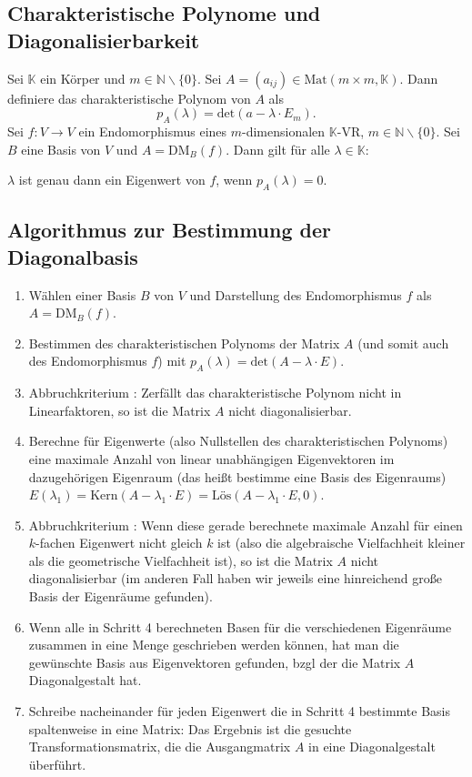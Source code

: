 \documentclass[a4paper,12pt]{article}
\newcommand{\RN}[1]{\uppercase\expandafter{\romannumeral#1}}
\begin{document}
\subsection{Charakteristische Polynome und Diagonalisierbarkeit}
Sei $\mathbb{K}$ ein Körper und $m \in \mathbb{N}\backslash\{0\}$. Sei $A=\left(a_{ij}\right) \in \text{Mat}\left(m\times m,\mathbb{K}\right)$. Dann definiere das charakteristische Polynom von $A$ als
\[ 
        p_A\left(\lambda \right)=\text{det}\left(a-\lambda \cdot E_m\right)
.\] 
Sei $f:V\rightarrow V$ ein Endomorphismus eines $m$-dimensionalen $\mathbb{K}$-VR, $m \in \mathbb{N}\backslash\{0\}$. Sei $B$ eine Basis von $V$ und $A=\text{DM}_B\left(f\right)$. Dann gilt für alle $\lambda  \in \mathbb{K}$:
\begin{center}
        $\lambda $ ist genau dann ein Eigenwert von $f$, wenn $p_A\left(\lambda \right)=0$.
\end{center}

\subsection{Algorithmus zur Bestimmung der Diagonalbasis}
\begin{enumerate}[label=(\arabic*)]
        \item Wählen einer Basis $B$ von $V$ und Darstellung des Endomorphismus $f$ als $A=\text{DM}_B\left(f\right)$.
        \item Bestimmen des charakteristischen Polynoms der Matrix $A$ (und somit auch des Endomorphismus $f$) mit $p_A\left(\lambda \right)=\text{det}\left(A-\lambda \cdot E\right)$.
        \item Abbruchkriterium \RN1: Zerfällt das charakteristische Polynom nicht in Linearfaktoren, so ist die Matrix $A$ nicht diagonalisierbar.
        \item Berechne für Eigenwerte (also Nullstellen des charakteristischen Polynoms) eine maximale Anzahl von linear unabhängigen Eigenvektoren im dazugehörigen Eigenraum (das heißt bestimme eine Basis des Eigenraums) $E\left(\lambda _1\right)=\text{Kern}\left(A-\lambda _1\cdot E\right)=\text{Lös}\left(A-\lambda _1\cdot E,0\right)$.
        \item Abbruchkriterium \RN2: Wenn diese gerade berechnete maximale Anzahl für einen $k$-fachen Eigenwert nicht gleich $k$ ist (also die algebraische Vielfachheit kleiner als die geometrische Vielfachheit ist), so ist die Matrix $A$ nicht diagonalisierbar (im anderen Fall haben wir jeweils eine hinreichend große Basis der Eigenräume gefunden). 
        \item Wenn alle in Schritt 4 berechneten Basen für die verschiedenen Eigenräume zusammen in eine Menge geschrieben werden können, hat man die gewünschte Basis aus Eigenvektoren gefunden, bzgl der die Matrix $A$ Diagonalgestalt hat.
        \item Schreibe nacheinander für jeden Eigenwert die in Schritt 4 bestimmte Basis spaltenweise in eine Matrix: Das Ergebnis ist die gesuchte Transformationsmatrix, die die Ausgangmatrix $A$ in eine Diagonalgestalt überführt.
\end{enumerate}
\end{document}
